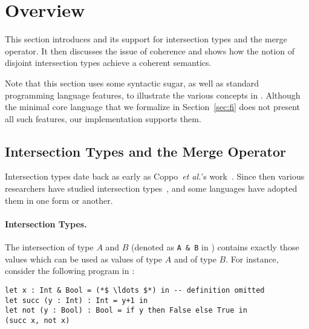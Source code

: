 \section{Overview} \label{sec:overview}

This section introduces \name and its support for intersection types and the
merge operator. It then discusses the issue of coherence and shows how the
notion of disjoint intersection types achieve a coherent semantics.

Note that this section uses some syntactic sugar, as well as standard
programming language features, to illustrate the various concepts in
\name. Although the minimal core language that we formalize in
Section~\ref{sec:fi} does not present all such features, our implementation
supports them.

\subsection{Intersection Types and the Merge Operator}

Intersection types date back as early as Coppo~\textit{et
al.}'s work~\cite{coppo1981functional}. Since then various researchers have
studied intersection types~\cite{Castagna}, and some languages have adopted them in one
form or another\cite{CDuce}.

\paragraph{Intersection Types.}
The intersection of type $A$ and $B$ (denoted as \lstinline{A & B} in
\name) contains exactly those values
which can be used as values of type $A$ and of type $B$. For instance,
consider the following program in \name:

\begin{lstlisting}
let x : Int & Bool = (*$ \ldots $*) in -- definition omitted
let succ (y : Int) : Int = y+1 in
let not (y : Bool) : Bool = if y then False else True in
(succ x, not x)
\end{lstlisting}

